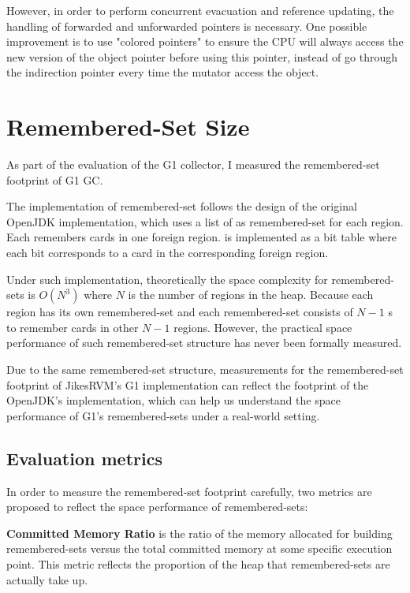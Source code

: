 However, in order to perform concurrent evacuation and reference updating, the handling
of forwarded and unforwarded pointers is necessary.
One possible improvement is to use "colored pointers" to ensure the CPU will always access
the new version of the object pointer before using this pointer,
instead of go through the indirection pointer every time the mutator access the object.

\section{Remembered-Set Size} %
\label{sec:remsetsize}

As part of the evaluation of the G1 collector, I measured the remembered-set footprint
of G1 GC.

The implementation of remembered-set follows the design of the original OpenJDK
implementation, which uses a list of  as remembered-set
for each region. Each  remembers cards in one foreign region.
 is implemented as a bit table where each bit corresponds
to a card in the corresponding foreign region. 

Under such implementation, theoretically the space complexity for remembered-sets
is $O(N^3)$ where $N$ is the number of regions in the heap. Because each region
has its own remembered-set and each remembered-set consists of $N-1$ s
to remember cards in other $N-1$ regions. However, the practical space performance
of such remembered-set structure has never been formally measured.

Due to the same remembered-set structure,
measurements for the remembered-set footprint of JikesRVM's G1 implementation can reflect
the footprint of the OpenJDK's implementation, which can help us understand the
space performance of G1's remembered-sets under a real-world setting.

\subsection{Evaluation metrics}

In order to measure the remembered-set footprint carefully, two metrics are proposed
to reflect the space performance of remembered-sets:

\textbf{Committed Memory Ratio} is the ratio of the memory allocated for building remembered-sets
versus the total committed memory at some specific execution point.
This metric reflects the proportion of the heap that remembered-sets are actually take up.

